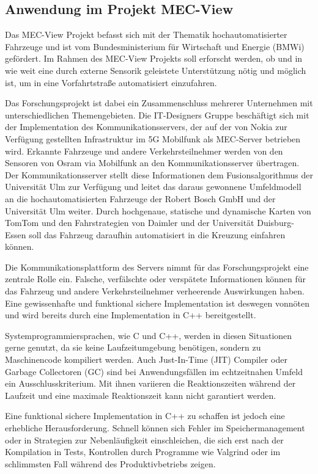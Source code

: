 \begin{multicols}{2}
\subsection*{Anwendung im Projekt MEC-View}

Das MEC-View Projekt befasst sich mit der Thematik hochautomatisierter Fahrzeuge und ist vom Bundesministerium für Wirtschaft und Energie (BMWi) gefördert.
Im Rahmen des MEC-View Projekts soll erforscht werden, ob und in wie weit eine durch externe Sensorik geleistete Unterstützung nötig und möglich ist, um in eine Vorfahrtstraße automatisiert einzufahren.

\bildIII

Das Forschungsprojekt ist dabei ein Zusammenschluss mehrerer Unternehmen mit unterschiedlichen Themengebieten. Die IT-Designers Gruppe beschäftigt sich mit der Implementation des Kommunikationsservers, der auf der von Nokia zur Verfügung gestellten
Infrastruktur im 5G Mobilfunk als MEC-Server betrieben wird. Erkannte Fahrzeuge und
andere Verkehrsteilnehmer werden von den Sensoren von Osram via Mobilfunk an den
Kommunikationsserver übertragen. Der Kommunikationsserver stellt diese Informationen
dem Fusionsalgorithmus der Universität Ulm zur Verfügung und leitet das daraus gewonnene Umfeldmodell an die hochautomatisierten Fahrzeuge der Robert Bosch GmbH und der Universität
Ulm weiter. Durch hochgenaue, statische und dynamische Karten von TomTom und den
Fahrstrategien von Daimler und der Universität Duisburg-Essen soll das Fahrzeug daraufhin automatisiert in die Kreuzung einfahren können.

Die Kommunikationsplattform des Servers nimmt für das Forschungsprojekt eine zentrale Rolle ein.
Falsche, verfälschte oder verspätete Informationen können für das Fahrzeug und andere Verkehrsteilnehmer verheerende Auswirkungen haben.
Eine gewissenhafte und funktional sichere Implementation ist deswegen vonnöten und wird bereits durch eine Implementation in C++ bereitgestellt.

Systemprogrammiersprachen, wie C und C++, werden in diesen Situationen gerne genutzt, da sie keine Laufzeitumgebung benötigen, sondern zu Maschinencode kompiliert werden.
Auch Just-In-Time (JIT) Compiler oder Garbage Collectoren (GC) sind bei Anwendungsfällen im echtzeitnahen Umfeld ein Ausschlusskriterium.
Mit ihnen variieren die Reaktionszeiten während der Laufzeit und eine maximale Reaktionszeit kann nicht garantiert werden.

Eine funktional sichere Implementation in C++ zu schaffen ist jedoch eine erhebliche Herausforderung.
Schnell können sich Fehler im Speichermanagement oder in Strategien zur Nebenläufigkeit einschleichen, die sich erst nach der Kompilation in Tests, Kontrollen durch Programme wie Valgrind oder im schlimmsten Fall während des Produktivbetriebs zeigen.


\end{multicols}
